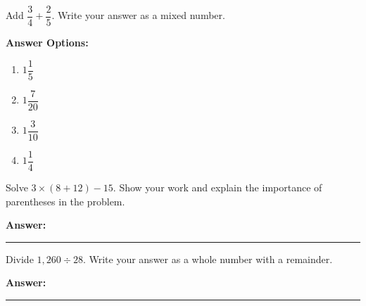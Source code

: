 \documentclass[12pt]{article}
\begin{document}
\begin{tcolorbox}[colframe=black!50, colback=white, title=\textbf{Problem 8}]
Add \( \dfrac{3}{4} + \dfrac{2}{5} \). Write your answer as a mixed number. \vspace{0.5em}
 
\textbf{Answer Options:}
\begin{enumerate}[label=(\Alph*), itemsep=0.5cm]
    \item \(1\dfrac{1}{5}\)
    \item \(1\dfrac{7}{20}\)
    \item \(1\dfrac{3}{10}\)
    \item \(1\dfrac{1}{4}\)
\end{enumerate}

\end{tcolorbox}

\begin{tcolorbox}[colframe=black!50, colback=white, title=\textbf{Problem 9}]
Solve \(3 \times (8 + 12) - 15\). Show your work and explain the importance of parentheses in the problem.

\vspace{2.5cm}
\textbf{Answer:} \rule{0.5\textwidth}{0.4mm}
\end{tcolorbox}

\begin{tcolorbox}[colframe=black!50, colback=white, title=\textbf{Problem 10}]
Divide \(1,260 \div 28\). Write your answer as a whole number with a remainder.

\vspace{3cm}
\textbf{Answer:} \rule{0.5\textwidth}{0.4mm}
\end{tcolorbox}
\end{document}
